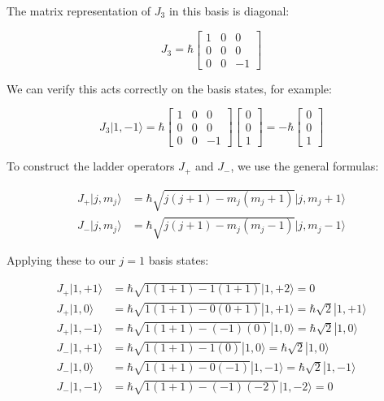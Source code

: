 The matrix representation of $J_3$ in this basis is diagonal:

\[
J_{3}=\hbar\left[\begin{array}{ccc}
1 & 0 & 0  \\
0 & 0 & 0 \\
0 & 0 & -1
\end{array}\right]
\]

We can verify this acts correctly on the basis states, for example:

\[
J_{3}|1,-1\rangle=\hbar\left[\begin{array}{ccc}
1 & 0 & 0  \\
0 & 0 & 0 \\
0 & 0 & -1
\end{array}\right]\left[\begin{array}{l}
0 \\
0 \\
1
\end{array}\right]=-\hbar\left[\begin{array}{l}
0 \\
0 \\
1
\end{array}\right]
\]

To construct the ladder operators $J_+$ and $J_-$, we use the general formulas:

\begin{align}
J_{+}|j,m_j\rangle &= \hbar\sqrt{j(j+1)-m_j(m_j+1)}|j,m_j+1\rangle  \\
J_{-}|j,m_j\rangle &= \hbar\sqrt{j(j+1)-m_j(m_j-1)}|j,m_j-1\rangle
\end{align}

Applying these to our $j=1$ basis states:

\begin{align}
J_{+}|1,+1\rangle &= \hbar\sqrt{1(1+1)-1(1+1)}|1,+2\rangle=0 \\
J_{+}|1,0\rangle &= \hbar\sqrt{1(1+1)-0(0+1)}|1,+1\rangle=\hbar\sqrt{2}|1,+1\rangle \\
J_{+}|1,-1\rangle &= \hbar\sqrt{1(1+1)-(-1)(0)}|1,0\rangle=\hbar\sqrt{2}|1,0\rangle \\
J_{-}|1,+1\rangle &= \hbar\sqrt{1(1+1)-1(0)}|1,0\rangle=\hbar\sqrt{2}|1,0\rangle  \\
J_{-}|1,0\rangle &= \hbar\sqrt{1(1+1)-0(-1)}|1,-1\rangle=\hbar\sqrt{2}|1,-1\rangle \\
J_{-}|1,-1\rangle &= \hbar\sqrt{1(1+1)-(-1)(-2)}|1,-2\rangle=0
\end{align}

